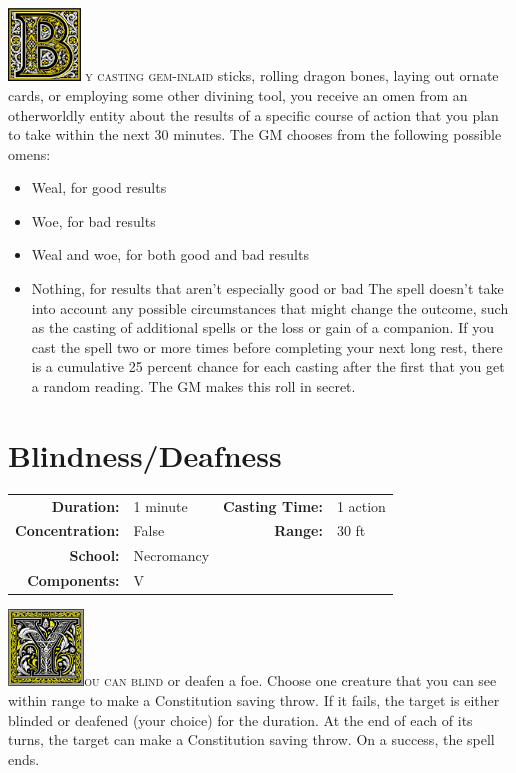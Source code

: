 \documentclass[12pt,showtrims]{memoir}
\begin{document}
\vspace{1\baselineskip}\noindent
\lettrine[lines=4]{\includegraphics[height=55pt]{initials/B.png}}{\kern 1pt y casting gem-inlaid} sticks, rolling dragon bones, laying out ornate cards, or employing some other divining tool, you receive an omen from an otherworldly entity about the results of a specific course of action that you plan to take within the next 30 minutes. The GM chooses from the following possible omens:
\begin{itemize}
    \item Weal, for good results
    \item Woe, for bad results
    \item Weal and woe, for both good and bad results
    \item Nothing, for results that aren't especially good or bad The spell doesn't take into account any possible circumstances that might change the outcome, such as the casting of additional spells or the loss or gain of a companion. If you cast the spell two or more times before completing your next long rest, there is a cumulative 25 percent chance for each casting after the first that you get a random reading. The GM makes this roll in secret.
\end{itemize}

\newpage
\section*{Blindness/Deafness}
{
\small\centering\vspace{-6pt}
\begin{tabular}{rlrl}
\toprule

\textbf{Duration:} & 1 minute &
\textbf{Casting Time:} & 1 action \\
\textbf{Concentration:} & False &
\textbf{Range:} & 30 ft \\
\textbf{School:} & Necromancy \\
\textbf{Components:} & \multicolumn{3}{p{0.7\textwidth}}{V}\\

\bottomrule
\end{tabular}
}
\vspace{1\baselineskip}\noindent
\lettrine[lines=4]{\includegraphics[height=58pt]{initials/Y.png}}{ou can blind} or deafen a foe. Choose one creature that you can see within range to make a Constitution saving throw. If it fails, the target is either blinded or deafened (your choice) for the duration. At the end of each of its turns, the target can make a Constitution saving throw. On a success, the spell ends.
\end{document}
